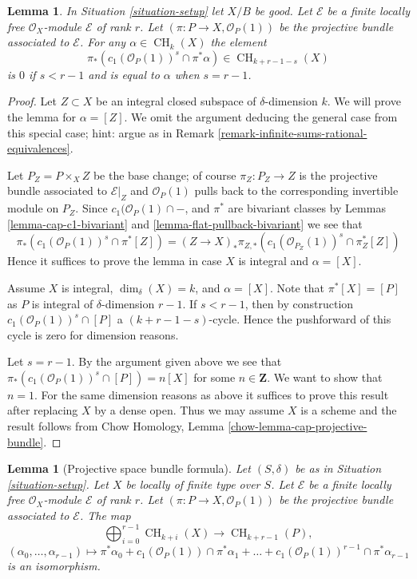 \documentclass{stacks-project}
\theoremstyle{plain}
\newtheorem{lemma}[subsection]{Lemma}
\theoremstyle{definition}
\theoremstyle{remark}
\numberwithin{equation}{subsection}
\def\CH{\mathop{\mathrm{CH}}\nolimits}
\begin{document}
\begin{lemma}
\label{lemma-cap-projective-bundle}
In Situation \ref{situation-setup} let $X/B$ be good.
Let $\mathcal{E}$ be a finite locally free $\mathcal{O}_X$-module
$\mathcal{E}$ of rank $r$. Let $(\pi : P \to X, \mathcal{O}_P(1))$
be the projective bundle associated to $\mathcal{E}$.
For any $\alpha \in \CH_k(X)$ the element
$$
\pi_*\left(
c_1(\mathcal{O}_P(1))^s \cap \pi^*\alpha
\right)
\in
\CH_{k + r - 1 - s}(X)
$$
is $0$ if $s < r - 1$ and is equal to $\alpha$ when $s = r - 1$.
\end{lemma}

\begin{proof}
Let $Z \subset X$ be an integral closed subspace of $\delta$-dimension $k$.
We will prove the lemma for $\alpha = [Z]$. We omit the argument
deducing the general case from this special case; hint: argue as in
Remark \ref{remark-infinite-sums-rational-equivalences}.

\medskip\noindent
Let $P_Z = P \times_X Z$ be the base change; of course
$\pi_Z : P_Z \to Z$ is the projective bundle associated to $\mathcal{E}|_Z$
and $\mathcal{O}_P(1)$ pulls back to the corresponding
invertible module on $P_Z$. Since $c_1(\mathcal{O}_P(1) \cap -$, and
$\pi^*$ are bivariant classes by Lemmas
\ref{lemma-cap-c1-bivariant} and \ref{lemma-flat-pullback-bivariant}
we see that
$$
\pi_*\left(
c_1(\mathcal{O}_P(1))^s \cap \pi^*[Z]
\right)
=
(Z \to X)_*\pi_{Z, *}\left(
c_1(\mathcal{O}_{P_Z}(1))^s \cap \pi_Z^*[Z]
\right)
$$
Hence it suffices to prove the lemma in case $X$ is integral
and $\alpha  = [X]$.

\medskip\noindent
Assume $X$ is integral, $\dim_\delta(X) = k$, and $\alpha = [X]$.
Note that $\pi^*[X] = [P]$ as $P$ is integral of
$\delta$-dimension $r - 1$. If $s < r - 1$, then by construction
$c_1(\mathcal{O}_P(1))^s \cap [P]$ a $(k + r - 1 - s)$-cycle.
Hence the pushforward of this cycle is zero for dimension reasons.

\medskip\noindent
Let $s = r - 1$. By the argument given above we see that
$\pi_*(c_1(\mathcal{O}_P(1))^s \cap [P]) = n [X]$
for some $n \in \mathbf{Z}$. We want to show that $n = 1$.
For the same dimension reasons as above it suffices to prove this
result after replacing $X$ by a dense open.
Thus we may assume $X$ is a scheme and the result follows
from Chow Homology, Lemma \ref{chow-lemma-cap-projective-bundle}.
\end{proof}

\begin{lemma}[Projective space bundle formula]
\label{lemma-chow-ring-projective-bundle}
Let $(S, \delta)$ be as in Situation \ref{situation-setup}.
Let $X$ be locally of finite type over $S$.
Let $\mathcal{E}$ be a finite locally free $\mathcal{O}_X$-module
$\mathcal{E}$ of rank $r$. Let $(\pi : P \to X, \mathcal{O}_P(1))$
be the projective bundle associated to $\mathcal{E}$.
The map
$$
\bigoplus\nolimits_{i = 0}^{r - 1}
\CH_{k + i}(X)
\longrightarrow
\CH_{k + r - 1}(P),
$$
$$
(\alpha_0, \ldots, \alpha_{r-1})
\longmapsto
\pi^*\alpha_0 +
c_1(\mathcal{O}_P(1)) \cap \pi^*\alpha_1
+ \ldots +
c_1(\mathcal{O}_P(1))^{r - 1} \cap \pi^*\alpha_{r-1}
$$
is an isomorphism.
\end{lemma}
\end{document}
